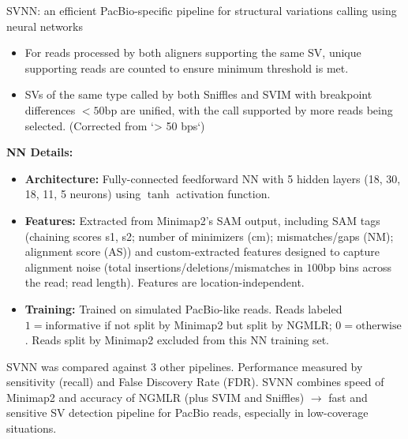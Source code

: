 \documentclass[twocolumn]{article}
\begin{document}
\begin{literaturepaper}{SVNN: an efficient PacBio-specific pipeline for structural variations calling using neural networks \cite{Akbarinejad2021}}
\begin{itemize}
        \begin{itemize}
            \item For reads processed by both aligners supporting the same SV, unique supporting reads are counted to ensure minimum threshold is met. 
            \item SVs of the same type called by both Sniffles and SVIM with breakpoint differences $< 50 \text{bp}$ are unified, with the call supported by more reads being selected. (Corrected from `> 50 bps`)
        \end{itemize}
    \end{itemize}

    \textbf{NN Details:}
    \begin{itemize}
        \item \textbf{Architecture:} Fully-connected feedforward NN with 5 hidden layers (18, 30, 18, 11, 5 neurons) using $\tanh$ activation function.
        \item \textbf{Features:} Extracted from Minimap2's SAM output, including SAM tags (chaining scores s1, s2; number of minimizers (cm); mismatches/gaps (NM); alignment score (AS)) and custom-extracted features designed to capture alignment noise (total insertions/deletions/mismatches in $100\text{bp}$ bins across the read; read length). Features are location-independent.
        \item \textbf{Training:} Trained on simulated PacBio-like reads. Reads labeled $1 = \text{informative}$ if not split by Minimap2 but split by NGMLR; $0 = \text{otherwise}$. Reads split by Minimap2 excluded from this NN training set. 
    \end{itemize}

    SVNN was compared against 3 other pipelines. Performance measured by sensitivity (recall) and False Discovery Rate (FDR).
    SVNN combines speed of Minimap2 and accuracy of NGMLR (plus SVIM and Sniffles) $\rightarrow$ fast and sensitive SV detection pipeline for PacBio reads, especially in low-coverage situations.


\end{literaturepaper}
\end{document}
